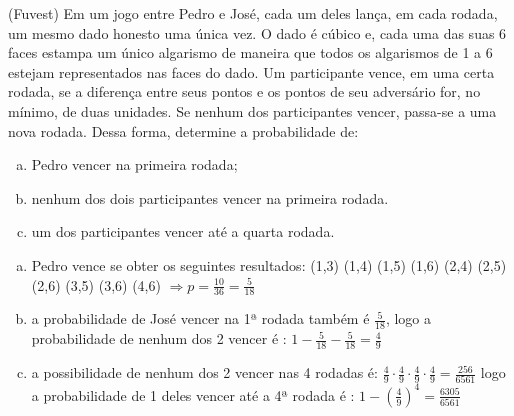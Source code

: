 \begin{ex}
(Fuvest) Em um jogo entre Pedro e José, cada um deles lança, em cada rodada, um mesmo dado honesto uma única vez. O dado é cúbico e, cada uma das suas 6 faces estampa um único algarismo de maneira que todos os algarismos de 1 a 6 estejam representados nas faces do dado. Um participante vence, em uma certa rodada, se a diferença entre seus pontos e os pontos de seu  adversário for, no mínimo, de duas unidades. Se nenhum dos participantes vencer, passa-se a uma nova rodada. Dessa forma, determine a probabilidade de:
   \begin{enumerate}[(a)]
   \item Pedro vencer na primeira rodada;
   \item nenhum dos dois participantes vencer na primeira rodada.
   \item um dos participantes vencer até a quarta rodada.
   \end{enumerate}
     \begin{sol}
      \phantom{A}
       \begin{enumerate} [(a)]
           \item Pedro vence se obter os seguintes resultados: (1,3) (1,4) (1,5) (1,6) (2,4) (2,5) (2,6) (3,5) (3,6) (4,6) $\Longrightarrow p=\frac{10}{36}=\frac{5}{18}$
           \item a probabilidade de José vencer na 1ª rodada  também é $\frac{5}{18}$, logo a probabilidade de nenhum dos 2 vencer é : $1-\frac{5}{18}-\frac{5}{18}= \frac{4}{9}$
           \item a possibilidade de nenhum dos 2 vencer nas 4 rodadas é: $\frac{4}{9}\cdot\frac{4}{9}\cdot\frac{4}{9}\cdot\frac{4}{9}=\frac{256}{6561}$ logo a probabilidade de 1 deles vencer até a 4ª rodada é :
          $1-(\frac{4}{9})^4=\frac{6305}{6561}$
       \end{enumerate}
     \end{sol}
\end{ex}